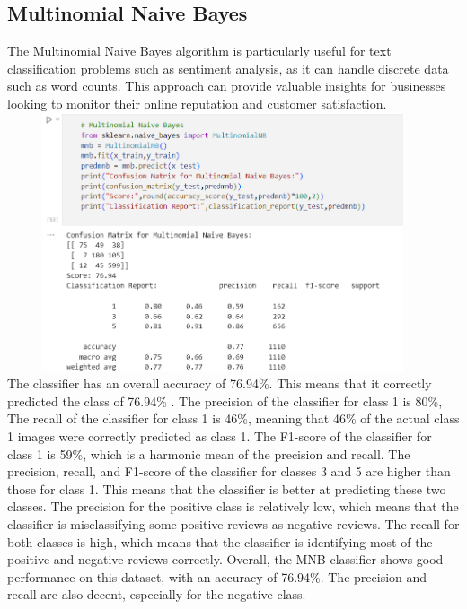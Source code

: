 \documentclass[a4paper, 12pt]{report}
\begin{document}
\subsection{Multinomial Naive Bayes}
The Multinomial Naive Bayes algorithm is particularly useful for text classification problems such as sentiment analysis, as it can handle discrete data such as word counts. This approach can provide valuable insights for businesses looking to monitor their online reputation and customer satisfaction.\\
\includegraphics[height=3in,width=5in]{20}\\
The classifier has an overall accuracy of 76.94\%. This means that it correctly predicted the class of 76.94\% .
The precision of the classifier for class 1 is 80\%,
The recall of the classifier for class 1 is 46\%, meaning that 46\% of the actual class 1 images were correctly predicted as class 1.
The F1-score of the classifier for class 1 is 59\%, which is a harmonic mean of the precision and recall.
The precision, recall, and F1-score of the classifier for classes 3 and 5 are higher than those for class 1. This means that the classifier is better at predicting these two classes.
The precision for the positive class is relatively low, which means that the classifier is misclassifying some positive reviews as negative reviews. The recall for both classes is high, which means that the classifier is identifying most of the positive and negative reviews correctly.
Overall, the MNB classifier shows good performance on this dataset, with an accuracy of 76.94\%. The precision and recall are also decent, especially for the negative class.
\pagebreak
\end{document}
